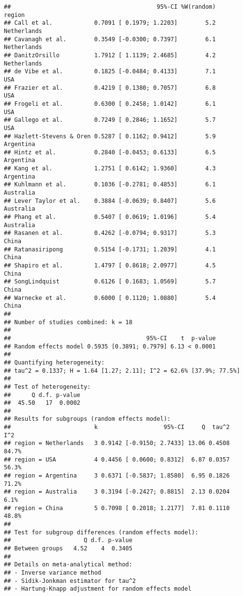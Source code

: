 \documentclass[]{book}
\theoremstyle{definition}
\theoremstyle{definition}
\theoremstyle{definition}
\theoremstyle{remark}
\begin{document}
\begin{verbatim}
##                                          95%-CI %W(random)      region
## Call et al.            0.7091 [ 0.1979; 1.2203]        5.2 Netherlands
## Cavanagh et al.        0.3549 [-0.0300; 0.7397]        6.1 Netherlands
## DanitzOrsillo          1.7912 [ 1.1139; 2.4685]        4.2 Netherlands
## de Vibe et al.         0.1825 [-0.0484; 0.4133]        7.1         USA
## Frazier et al.         0.4219 [ 0.1380; 0.7057]        6.8         USA
## Frogeli et al.         0.6300 [ 0.2458; 1.0142]        6.1         USA
## Gallego et al.         0.7249 [ 0.2846; 1.1652]        5.7         USA
## Hazlett-Stevens & Oren 0.5287 [ 0.1162; 0.9412]        5.9   Argentina
## Hintz et al.           0.2840 [-0.0453; 0.6133]        6.5   Argentina
## Kang et al.            1.2751 [ 0.6142; 1.9360]        4.3   Argentina
## Kuhlmann et al.        0.1036 [-0.2781; 0.4853]        6.1   Australia
## Lever Taylor et al.    0.3884 [-0.0639; 0.8407]        5.6   Australia
## Phang et al.           0.5407 [ 0.0619; 1.0196]        5.4   Australia
## Rasanen et al.         0.4262 [-0.0794; 0.9317]        5.3       China
## Ratanasiripong         0.5154 [-0.1731; 1.2039]        4.1       China
## Shapiro et al.         1.4797 [ 0.8618; 2.0977]        4.5       China
## SongLindquist          0.6126 [ 0.1683; 1.0569]        5.7       China
## Warnecke et al.        0.6000 [ 0.1120; 1.0880]        5.4       China
## 
## Number of studies combined: k = 18
## 
##                                       95%-CI    t  p-value
## Random effects model 0.5935 [0.3891; 0.7979] 6.13 < 0.0001
## 
## Quantifying heterogeneity:
## tau^2 = 0.1337; H = 1.64 [1.27; 2.11]; I^2 = 62.6% [37.9%; 77.5%]
## 
## Test of heterogeneity:
##      Q d.f. p-value
##  45.50   17  0.0002
## 
## Results for subgroups (random effects model):
##                        k                   95%-CI     Q  tau^2   I^2
## region = Netherlands   3 0.9142 [-0.9150; 2.7433] 13.06 0.4508 84.7%
## region = USA           4 0.4456 [ 0.0600; 0.8312]  6.87 0.0357 56.3%
## region = Argentina     3 0.6371 [-0.5837; 1.8580]  6.95 0.1826 71.2%
## region = Australia     3 0.3194 [-0.2427; 0.8815]  2.13 0.0204  6.1%
## region = China         5 0.7098 [ 0.2018; 1.2177]  7.81 0.1110 48.8%
## 
## Test for subgroup differences (random effects model):
##                     Q d.f. p-value
## Between groups   4.52    4  0.3405
## 
## Details on meta-analytical method:
## - Inverse variance method
## - Sidik-Jonkman estimator for tau^2
## - Hartung-Knapp adjustment for random effects model
\end{verbatim}
\end{document}
